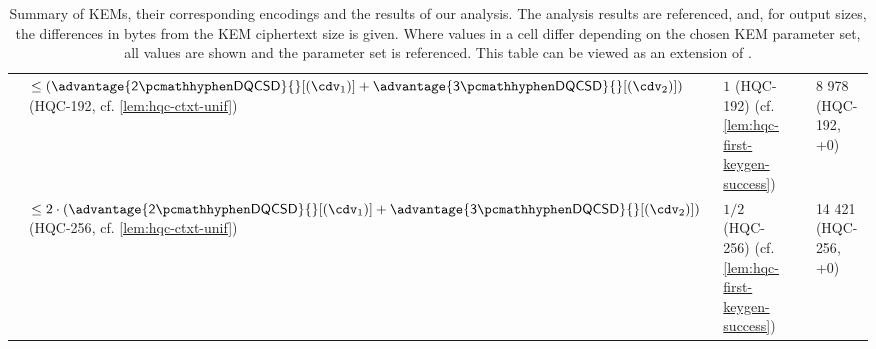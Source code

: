 \begin{table}
{\begin{tabular}{@{} L{0.18\textwidth-\tabcolsep} | L{0.41\tabcolsep} L{0.19\tabcolsep} L{0.16\tabcolsep} L{0.23\textwidth-\tabcolsep} @{}}
        & $\leq \left( \advantage{\twodqcsd}{}[(\cdv_1)] + \advantage{\threedqcsd}{}[(\cdv_2)] \right)$\newline
        (\textsf{HQC-192}, cf. \cref{lem:hqc-ctxt-unif})\vspace{0.5em}
        & $1$ (\textsf{HQC-192})\newline
        (cf. \cref{lem:hqc-first-keygen-success})
        &
        & 8 978 (\textsf{HQC-192}, +0)
        \\

        & $\leq 2 \cdot \left( \advantage{\twodqcsd}{}[(\cdv_1)] + \advantage{\threedqcsd}{}[(\cdv_2)] \right)$\newline
        (\textsf{HQC-256}, cf. \cref{lem:hqc-ctxt-unif})\vspace{0.5em}
        & $1/2$ (\textsf{HQC-256})\newline
        (cf. \cref{lem:hqc-first-keygen-success})
        &
        & 14 421 (\textsf{HQC-256}, +0)
    \end{tabular}
    }
    \caption[
        Summary of KEMs, their corresponding encodings and the results of our analysis.
    ]{
        Summary of KEMs, their corresponding encodings and the results of our analysis. The analysis results are referenced, and, for output sizes, the differences in bytes from the KEM ciphertext size is given. Where values in a cell differ depending on the chosen KEM parameter set, all values are shown and the parameter set is referenced. This table can be viewed as an extension of \cite[Table~2]{CCS:GunSteVei24}.
    }
    \label{tab:obfuscation-summary}
\end{table}
